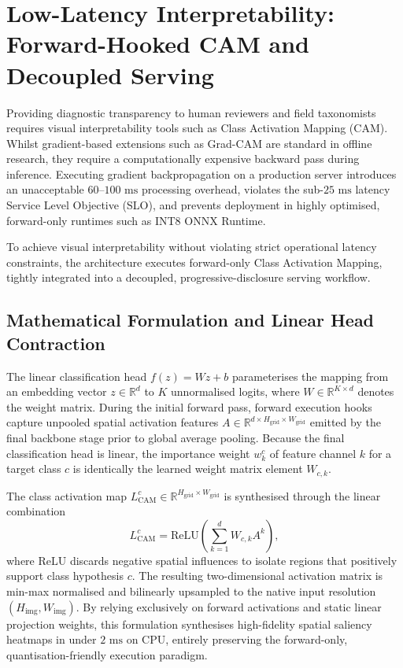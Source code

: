 \section{Low-Latency Interpretability: Forward-Hooked CAM and Decoupled Serving}
\label{sec:cam_shortcut}

Providing diagnostic transparency to human reviewers and field taxonomists requires visual interpretability tools such as Class Activation Mapping (CAM). Whilst gradient-based extensions such as Grad-CAM are standard in offline research, they require a computationally expensive backward pass during inference. Executing gradient backpropagation on a production server introduces an unacceptable $60\text{--}100\text{ ms}$ processing overhead, violates the sub-$25\text{ ms}$ latency Service Level Objective (SLO), and prevents deployment in highly optimised, forward-only runtimes such as INT8 ONNX Runtime.

To achieve visual interpretability without violating strict operational latency constraints, the architecture executes forward-only Class Activation Mapping, tightly integrated into a decoupled, progressive-disclosure serving workflow.

\subsection{Mathematical Formulation and Linear Head Contraction}
\label{subsec:cam_formulation}

The linear classification head $f(z) = W z + b$ parameterises the mapping from an embedding vector $z \in \mathbb{R}^d$ to $K$ unnormalised logits, where $W \in \mathbb{R}^{K \times d}$ denotes the weight matrix. During the initial forward pass, forward execution hooks capture unpooled spatial activation features $A \in \mathbb{R}^{d \times H_{\text{grid}} \times W_{\text{grid}}}$ emitted by the final backbone stage prior to global average pooling. Because the final classification head is linear, the importance weight $w_k^c$ of feature channel $k$ for a target class $c$ is identically the learned weight matrix element $W_{c, k}$.

The class activation map $L^c_{\text{CAM}} \in \mathbb{R}^{H_{\text{grid}} \times W_{\text{grid}}}$ is synthesised through the linear combination
\[
L^c_{\text{CAM}} = \text{ReLU}\left( \sum_{k=1}^d W_{c, k} A^k \right),
\]
where $\text{ReLU}$ discards negative spatial influences to isolate regions that positively support class hypothesis $c$. The resulting two-dimensional activation matrix is min-max normalised and bilinearly upsampled to the native input resolution $(H_{\text{img}}, W_{\text{img}})$. By relying exclusively on forward activations and static linear projection weights, this formulation synthesises high-fidelity spatial saliency heatmaps in under $2\text{ ms}$ on CPU, entirely preserving the forward-only, quantisation-friendly execution paradigm.

